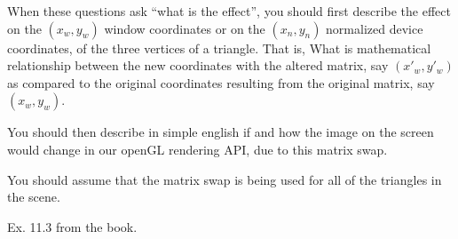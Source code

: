 \documentclass[letterpaper, 11pt]{article}
\begin{document}
\begin{enumerate}
When these questions ask ``what is the effect'', you should
first describe the effect on the $(x_w,y_w)$
window coordinates or on the $(x_n,y_n)$ normalized device coordinates,
of the three vertices
of a triangle. That is, What is
mathematical relationship between the new
coordinates with the altered matrix,
say $(x'_w,y'_w)$
as compared to the original coordinates
resulting from the original matrix,
say $(x_w,y_w)$.

You should then describe in simple english if and how
the image on the screen would change in our openGL rendering
API, due to this matrix swap.

You should assume that the matrix swap is being used for all
of the triangles in the scene.

\newpage

 Ex. 11.3 from the book.


\end{enumerate}
\end{document}
